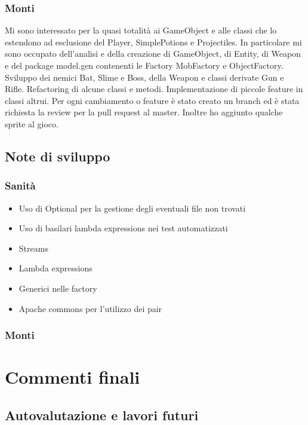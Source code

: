 \documentclass[a4paper,12pt]{report}
\begin{document}
    \subsection{Monti}
    \par Mi sono interessato per la quasi totalità ai GameObject e alle classi che lo estendono ad esclusione del Player, SimplePotions e Projectiles.
    In particolare mi sono occupato dell'analisi e della creazione di GameObject, di Entity, di Weapon e del package model.gen contenenti le Factory MobFactory
    e ObjectFactory.
    Sviluppo dei nemici Bat, Slime e Boss, della Weapon e classi derivate Gun e Rifle.
    Refactoring di alcune classi e metodi. Implementazione di piccole feature in classi altrui.
    Per ogni cambiamento o feature è stato creato un branch ed è stata richiesta la review per la pull request al master.
    Inoltre ho aggiunto qualche sprite al gioco.
    
    \section{Note di sviluppo}
    \subsection{Sanità}
    \begin{itemize}
            \item Uso di Optional per la gestione degli eventuali file non trovati
            \item Uso di basilari lambda expressions nei test automatizzati
    \end{itemize}
    \begin{itemize}
        \item Streams
        \item Lambda expressions
        \item Generici nelle factory
        \item Apache commons per l'utilizzo dei pair
    \end{itemize}
    \subsection{Monti}
    \chapter{Commenti finali}
    \section{Autovalutazione e lavori futuri}
\end{document}
